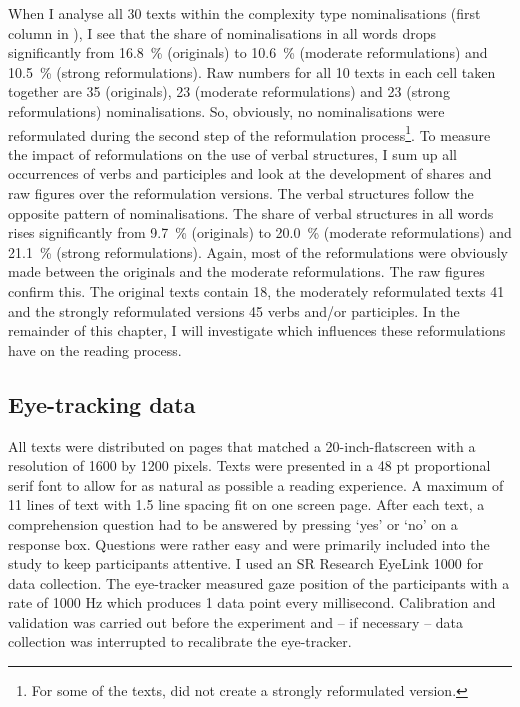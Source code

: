 \documentclass[output=paper]{langsci/langscibook}
\begin{document}
When I analyse all 30 texts within the complexity type nominalisations (first column in ), I see that the share of nominalisations in all words drops significantly from 16.8~\% (originals) to 10.6~\% (moderate reformulations) and 10.5~\% (strong reformulations). Raw numbers for all 10 texts in each cell taken together are 35 (originals), 23 (moderate reformulations) and 23 (strong reformulations) nominalisations. So, obviously, no nominalisations were reformulated during the second step of the reformulation process\footnote{For some of the texts, \citet{Hansen2006} did not create a strongly reformulated version.}. To measure the impact of reformulations on the use of verbal structures, I sum up all occurrences of verbs and participles and look at the development of shares and raw figures over the reformulation versions. The verbal structures follow the opposite pattern of nominalisations. The share of verbal structures in all words rises significantly from 9.7~\% (originals) to 20.0~\% (moderate reformulations) and 21.1~\% (strong reformulations). Again, most of the reformulations were obviously made between the originals and the moderate reformulations. The raw figures confirm this. The original texts contain 18, the moderately reformulated texts 41 and the strongly reformulated versions 45 verbs and/or participles. In the remainder of this chapter, I will investigate which influences these reformulations have on the reading process.

\subsection{\label{wolfer:sec:2.2}Eye-tracking data}

All texts were distributed on pages that matched a 20-inch-flatscreen with a resolution of 1600 by 1200 pixels. Texts were presented in a 48 pt proportional serif font to allow for as natural as possible a reading experience. A maximum of 11 lines of text with 1.5 line spacing fit on one screen page. After each text, a comprehension question had to be answered by pressing `yes' or `no' on a response box. Questions were rather easy and were primarily included into the study to keep participants attentive. I used an SR Research EyeLink 1000 for data collection. The eye-tracker measured gaze position of the participants with a rate of 1000 Hz which produces 1 data point every millisecond. Calibration and validation was carried out before the experiment and -- if necessary -- data collection was interrupted to recalibrate the eye-tracker.
\end{document}
